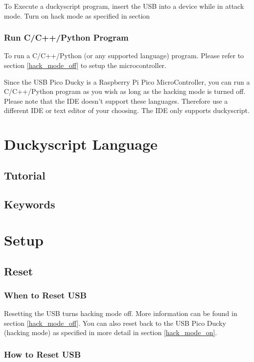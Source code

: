 \documentclass[a4paper,12pt]{article}
\begin{document}
To Execute a duckyscript program, insert the USB into a device while in attack mode. Turn on hack mode as specified in section \label{hack_mode_on}

\subsubsection{Run C/C++/Python Program}

To run a C/C++/Python (or any supported language) program. Please refer to section \ref{hack_mode_off} to setup the microcontroller.

Since the USB Pico Ducky is a Raspberry Pi Pico MicroController, you can run a C/C++/Python program as you wish as long as the hacking mode is turned off. Please note that the IDE doesn't support these languages. Therefore use a different IDE or text editor of your choosing. The IDE only supports duckyscript.

\section{Duckyscript Language}

\subsection{Tutorial}

\subsection{Keywords}


\section{Setup}

\subsection{Reset}

\subsubsection{When to Reset USB}

Resetting the USB turns hacking mode off. More information can be found in section \ref{hack_mode_off}. You can also reset back to the USB Pico Ducky (hacking mode) as specified in more detail in section \ref{hack_mode_on}.

\subsubsection{How to Reset USB}\label{how_to_reset}
\end{document}
